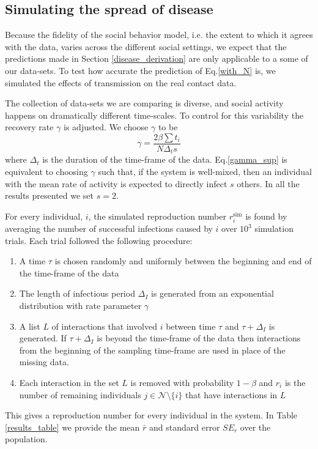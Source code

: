 \documentclass[10pt]{article}
\begin{document}
\begin{multicols}{2}
\subsection{Simulating the spread of disease}
\label{simulation}
Because the fidelity of the social behavior model, i.e. the extent to which it agrees with the data, varies across the different social settings, we expect that the predictions made in Section \ref{disease_derivation} are only applicable to a some of our data-sets. To test how accurate the prediction of Eq.\eqref{with_N} is, we simulated the effects of transmission on the real contact data.

The collection of data-sets we are comparing is diverse, and social activity happens on dramatically different time-scales. To control for this variability the recovery rate $\gamma$ is adjusted. We choose $\gamma$ to be  
\begin{equation}
\label{gamma_sup}
\gamma=\frac{2\beta\sum t_{i}}{N \Delta_{t} s}
\end{equation}
where $\Delta_{t}$ is the duration of the time-frame of the data. Eq.\eqref{gamma_sup} is equivalent to choosing $\gamma$ such that, if the system is well-mixed, then an individual with the mean rate of activity is expected to directly infect $s$ others. In all the results presented we set $s=2$.

For every individual, $i$, the simulated reproduction number $r_{i}^{\text{sim}}$ is found by averaging the number of successful infections caused by $i$ over $10^{3}$ simulation trials. Each trial followed the following procedure:
\begin{enumerate}
\item A time $\tau$ is chosen randomly and uniformly between the beginning and end of the time-frame of the data
\item The length of infectious period $\Delta_{I}$ is generated from an exponential distribution with rate parameter $\gamma$
\item A list $L$ of interactions that involved $i$ between time $\tau$ and $\tau+\Delta_{I}$ is generated. If $\tau+\Delta_{I}$ is beyond the time-frame of the data then interactions from the beginning of the sampling time-frame are used in place of the missing data. 
\item Each interaction in the set $L$ is removed with probability $1-\beta$ and $r_{i}$ is the number of remaining individuals $j\in\mathcal{N}\setminus\{i\}$ that have interactions in $L$ 
\end{enumerate}
This gives a reproduction number for every individual in the system. In Table \ref{results_table} we provide the mean $\bar{r}$ and standard error $SE_{r}$ over the population. 


\end{multicols}
\end{document}
